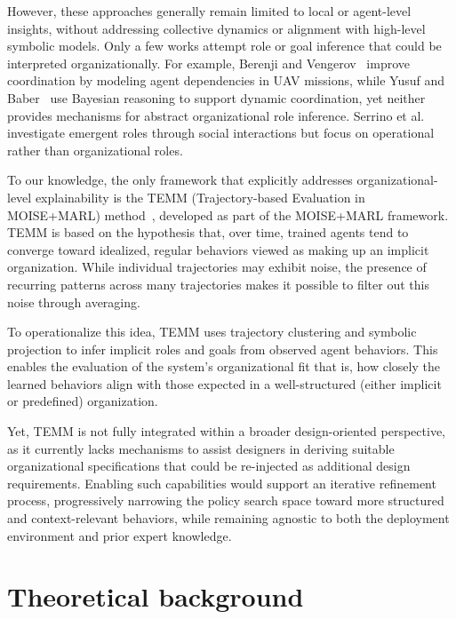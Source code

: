 \documentclass[pdflatex,sn-mathphys-num]{sn-jnl}%
\theoremstyle{thmstyleone}%
\theoremstyle{thmstyletwo}%
\theoremstyle{thmstylethree}%
\begin{document}
However, these approaches generally remain limited to local or agent-level insights, without addressing collective dynamics or alignment with high-level symbolic models. Only a few works attempt role or goal inference that could be interpreted organizationally. For example, Berenji and Vengerov~\cite{berenji2000learning} improve coordination by modeling agent dependencies in UAV missions, while Yusuf and Baber~\cite{yusuf2020inferential} use Bayesian reasoning to support dynamic coordination, yet neither provides mechanisms for abstract organizational role inference. Serrino et al.~\cite{serrino2019finding} investigate emergent roles through social interactions but focus on operational rather than organizational roles.

To our knowledge, the only framework that explicitly addresses organizational-level explainability is the TEMM (Trajectory-based Evaluation in MOISE+MARL) method~\cite{soule2025moisemarl}, developed as part of the MOISE+MARL framework. TEMM is based on the hypothesis that, over time, trained agents tend to converge toward idealized, regular behaviors viewed as making up an implicit organization. While individual trajectories may exhibit noise, the presence of recurring patterns across many trajectories makes it possible to filter out this noise through averaging.

To operationalize this idea, TEMM uses trajectory clustering and symbolic projection to infer implicit roles and goals from observed agent behaviors. This enables the evaluation of the system's organizational fit that is, how closely the learned behaviors align with those expected in a well-structured (either implicit or predefined) organization.

Yet, TEMM is not fully integrated within a broader design-oriented perspective, as it currently lacks mechanisms to assist designers in deriving suitable organizational specifications that could be re-injected as additional design requirements. Enabling such capabilities would support an iterative refinement process, progressively narrowing the policy search space toward more structured and context-relevant behaviors, while remaining agnostic to both the deployment environment and prior expert knowledge.



\section{Theoretical background}\label{sec:background}
\end{document}
